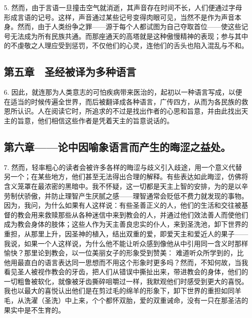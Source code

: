 5. 然而，由于言语一旦撞击空气就消逝，其声音存在时间不长，人们便通过字母形成言语的记号。这样，声音通过某些记号变得肉眼可见，当然不是作为声音本身。然而，由于人类纷争之罪——源于每个人都试图为自己夺取首位——使这些记号无法成为所有民族共通。而那座通天的高塔就是这种傲慢精神的表现；参与其中的不虔敬之人理应受到惩罚，不仅他们的心灵，连他们的舌头也陷入混乱与不和。\par


\subsection{第五章　圣经被译为多种语言}

6. 因此，就连那为人类意志的可怕疾病带来医治的，起初以一种语言写成，以便在适当的时候传遍全世界，而后被翻译成各种语言，广传四方，从而为各民族的救恩所认识。人在阅读它时，所追求的不过是找出作者的心思和旨意，并由此找出天主的旨意，他们相信这些作者是凭着天主的旨意说话的。\par


\subsection{第六章——论中因喻象语言而产生的晦涩之益处。}

7. 然而，轻率粗心的读者会被许多各样的晦涩与歧义引入歧途，用一个意义代替另一个；在某些地方，他们甚至无法得出合理的解释。有些表达如此晦涩，仿佛将含义笼罩在最浓密的黑暗中。我不怀疑，这一切都是天主上智的安排，为的是以辛劳制伏骄傲，并防止理智产生厌腻之感——理智通常会贬低不费力就发现的事物。因为，我问，为什么如果有人这样说：有些圣善正义的人，他们的生活和交往被基督的教会用来救赎那些从各种迷信中来到教会的人，并通过他们效法善人而使他们成为教会身体的肢体；这些人作为天主善良忠实的仆人，来到圣洗池，卸下世界的重担，从那里上升，因圣神的植入，结出双重的爱，即爱天主和爱近人的果子——我说，如果一个人这样说，为什么他不能让听众感到像他从中引用同一含义时那样愉快？那里论到教会，以一位美丽女子的形象受到赞美： 难道听众所学到的，比他用最直白的语言表达同一思想而不用这个形象时更多吗？然而，不知何故，当我看见圣人被视作教会的牙齿，把人们从错误中撕扯出来，带进教会的身体，他们的一切粗鲁被软化，就像被牙齿撕碎咀嚼过一样，我默观他们时感受到更大的喜悦。我也以最大的喜悦认出他们是在剪过毛的绵羊的形象下，卸下世界的重担如同羊毛，从洗濯（圣洗）中上来，个个都怀双胎，爱的双重诫命，没有一只在那圣洁的果实中是不生育的。\par

